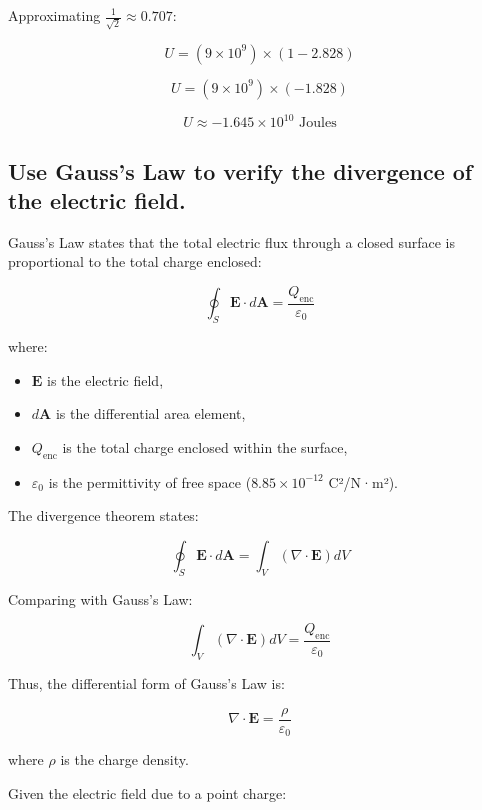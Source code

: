 \documentclass[a4paper,12pt]{article}
\begin{document}
Approximating \( \frac{1}{\sqrt{2}} \approx 0.707 \):

\[
U = (9 \times 10^9) \times (1 - 2.828)
\]

\[
U = (9 \times 10^9) \times (-1.828)
\]

\[
\boxed{U \approx -1.645 \times 10^{10} \text{ Joules}}
\]


\subsection{Use Gauss’s Law to verify the divergence of the electric field.}
Gauss’s Law states that the total electric flux through a closed surface is proportional to the total charge enclosed:

\begin{equation}
\oint_S \mathbf{E} \cdot d\mathbf{A} = \frac{Q_{\text{enc}}}{\varepsilon_0}
\end{equation}

where:
\begin{itemize}
    \item \( \mathbf{E} \) is the electric field,
    \item \( d\mathbf{A} \) is the differential area element,
    \item \( Q_{\text{enc}} \) is the total charge enclosed within the surface,
    \item \( \varepsilon_0 \) is the permittivity of free space (\( 8.85 \times 10^{-12} \) C²/N·m²).
\end{itemize}

The divergence theorem states:

\begin{equation}
\oint_S \mathbf{E} \cdot d\mathbf{A} = \int_V (\nabla \cdot \mathbf{E}) dV
\end{equation}

Comparing with Gauss’s Law:

\begin{equation}
\int_V (\nabla \cdot \mathbf{E}) dV = \frac{Q_{\text{enc}}}{\varepsilon_0}
\end{equation}

Thus, the differential form of Gauss’s Law is:

\begin{equation}
\nabla \cdot \mathbf{E} = \frac{\rho}{\varepsilon_0}
\end{equation}

where \( \rho \) is the charge density.

Given the electric field due to a point charge:
\end{document}
